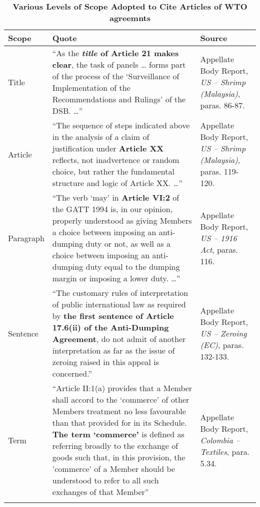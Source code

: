 \begin{xltabular}{\linewidth}{lXX}
   \caption{\textbf{Various Levels of Scope Adopted to Cite Articles of WTO agreemnts}}\\
   \hline
   \textbf{\normalsize Scope}
   & \textbf{\normalsize Quote}
   & \textbf{\normalsize Source}
   \\
   \endfirsthead
   \hline \hline
   Title
   & ``As the \textbf{\textit{title}
   of Article 21 makes clear},
   the task of panels \ldots
   forms part of the process
   of the `Surveillance of
   Implementation of the
   Recommendations and Rulings' of the
   DSB. \ldots''
   & Appellate Body Report, \textit{US – Shrimp (Malaysia)}, paras. 86-87.
   \\
   \hline
   Article
   &  ``The sequence of steps indicated above in the analysis of a claim of justification under \textbf{Article XX} reflects, not inadvertence or random choice, but rather the fundamental structure and logic of Article XX. \ldots''
   & Appellate Body Report, \textit{US – Shrimp (Malaysia)}, paras. 119-120.
   \\
   \hline
   Paragraph
   &  ``The verb `may' in \textbf{Article VI:2} of the GATT 1994 is, in our opinion, properly
   understood as giving Members a choice between imposing an anti-dumping duty or
   not, as well as a choice between imposing an anti-dumping duty equal to the dumping
   margin or imposing a lower duty. \ldots''
   & Appellate Body Report, \textit{US – 1916 Act}, paras. 116.    
   \\
   \hline
   Sentence
   & ``The customary rules of interpretation of public international law as
   required by \textbf{the first sentence of Article 17.6(ii) of the Anti-Dumping Agreement}, do
   not admit of another interpretation as far as the issue of zeroing raised in this appeal
   is concerned.''
   & Appellate Body Report, \textit{US – Zeroing (EC)}, paras. 132-133.
   \\
   \hline
   Term
   & ``Article II:1(a) provides that a
   Member shall accord to the `commerce' of other Members treatment no less
   favourable than that provided for in its Schedule. \textbf{The term `commerce'} is defined as
   referring broadly to the exchange of goods such that, in this provision, the 'commerce'
   of a Member should be understood to refer to all such exchanges of that Member''
   & Appellate Body Report, \textit{Colombia – Textiles}, para. 5.34.
   \\
   \hline
   \label{xltabular:level-of-scopes}
\end{xltabular}
 
